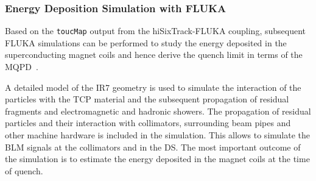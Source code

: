 





\subsubsection{Energy Deposition Simulation with FLUKA}

Based on the \texttt{toucMap} output from the hiSixTrack-FLUKA coupling, subsequent FLUKA simulations can be performed to study the energy deposited in the superconducting magnet coils and hence derive the quench limit in terms of the MQPD~\cite{IPAC15:TUPTY046}. 
\vspace{0.2cm}

A detailed model of the IR7 geometry is used to simulate the interaction of the particles with the TCP material and the subsequent propagation of residual fragments and electromagnetic and hadronic showers. The propagation of residual particles and their interaction with collimators, surrounding beam pipes and other machine hardware is included in the simulation. This allows to simulate the BLM signals at the collimators and in the DS. The most important outcome of the simulation is to estimate the energy deposited in the magnet coils at the time of quench. 
\vspace{0.2cm}

